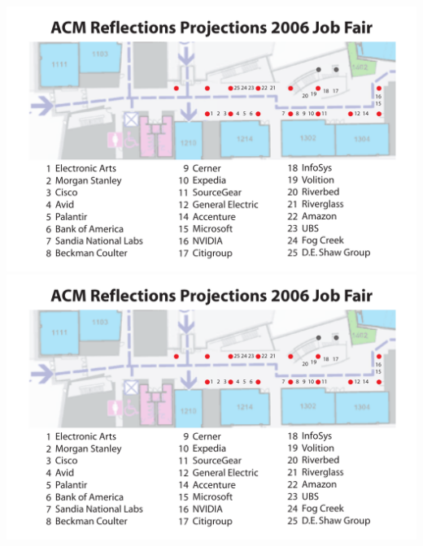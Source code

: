 \documentclass{article}
\begin{document}
\begin{centering}

\noindent
\includegraphics{JobFairMap.pdf}\\
\includegraphics{JobFairMap.pdf}


\end{centering}
\end{document}
